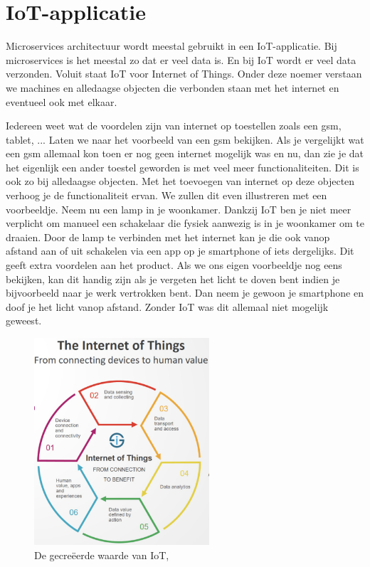 \autocite{Google2019}

\section{IoT-applicatie}
Microservices architectuur wordt meestal gebruikt in een IoT-applicatie. Bij microservices is het meestal zo dat er veel data is. En bij IoT wordt er veel data verzonden. Voluit staat IoT voor Internet of Things. Onder deze noemer verstaan we machines en alledaagse objecten die verbonden staan met het internet en eventueel ook met elkaar.

Iedereen weet wat de voordelen zijn van internet op toestellen zoals een gsm, tablet, ... Laten we naar het voorbeeld van een gsm bekijken. Als je vergelijkt wat een gsm allemaal kon toen er nog geen internet mogelijk was en nu, dan zie je dat het eigenlijk een ander toestel geworden is met veel meer functionaliteiten. Dit is ook zo bij alledaagse objecten. Met het toevoegen van internet op deze objecten verhoog je de functionaliteit ervan. We zullen dit even illustreren met een voorbeeldje. Neem nu een lamp in je woonkamer. Dankzij IoT ben je niet meer verplicht om manueel een schakelaar die fysiek aanwezig is in je woonkamer om te draaien. Door de lamp te verbinden met het internet kan je die ook vanop afstand aan of uit schakelen via een app op je smartphone of iets dergelijks. Dit geeft extra voordelen aan het product. Als we ons eigen voorbeeldje nog eens bekijken, kan dit handig zijn als je vergeten het licht te doven bent indien je bijvoorbeeld naar je werk vertrokken bent. Dan neem je gewoon je smartphone en doof je het licht vanop afstand. Zonder IoT was dit allemaal niet mogelijk geweest.

 \begin{figure}[h!]
    \centering
    \includegraphics[width=65mm]{../IoT.png}
    \caption{De gecreëerde waarde van IoT, \autocite{i-scoop2019}}
    
\end{figure}

